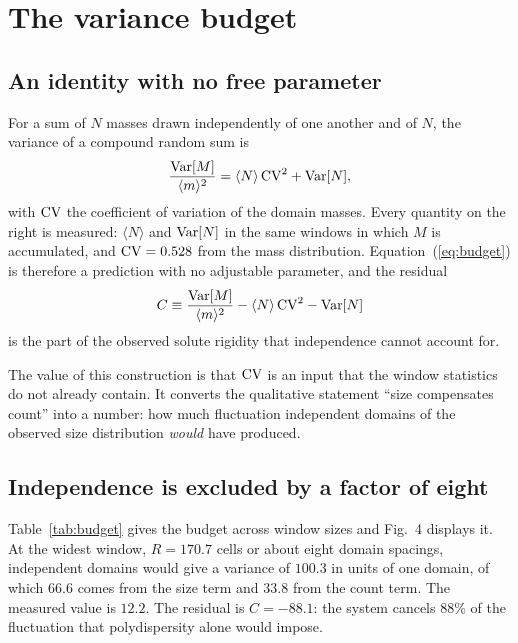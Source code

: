 \documentclass[aps,pre,twocolumn,superscriptaddress,floatfix,longbibliography]{revtex4-2}
\begin{document}
\section{The variance budget}

\subsection{An identity with no free parameter}

For a sum of $N$ masses drawn independently of one another and of $N$, the
variance of a compound random sum is
\begin{equation}
  \frac{{\rm Var}[M]}{\langle m \rangle^2}
  = \langle N \rangle \, {\rm CV}^2 + {\rm Var}[N] ,
  \label{eq:budget}
\end{equation}
with ${\rm CV}$ the coefficient of variation of the domain masses. Every
quantity on the right is measured: $\langle N \rangle$ and ${\rm Var}[N]$ in
the same windows in which $M$ is accumulated, and ${\rm CV} = 0.528$ from the
mass distribution. Equation~(\ref{eq:budget}) is therefore a prediction with no
adjustable parameter, and the residual
\begin{equation}
  C \equiv \frac{{\rm Var}[M]}{\langle m \rangle^2}
  - \langle N \rangle \, {\rm CV}^2 - {\rm Var}[N]
\end{equation}
is the part of the observed solute rigidity that independence cannot account
for.

The value of this construction is that ${\rm CV}$ is an input that the window
statistics do not already contain. It converts the qualitative statement
``size compensates count'' into a number: how much fluctuation independent
domains of the observed size distribution \emph{would} have produced.

\subsection{Independence is excluded by a factor of eight}

Table~\ref{tab:budget} gives the budget across window sizes and Fig.~4
displays it. At the widest window, $R = 170.7$ cells or about eight domain
spacings, independent domains would give a variance of $100.3$ in units of one
domain, of which $66.6$ comes from the size term and $33.8$ from the count
term. The measured value is $12.2$. The residual is $C = -88.1$: the system
cancels $88\%$ of the fluctuation that polydispersity alone would impose.
\end{document}

